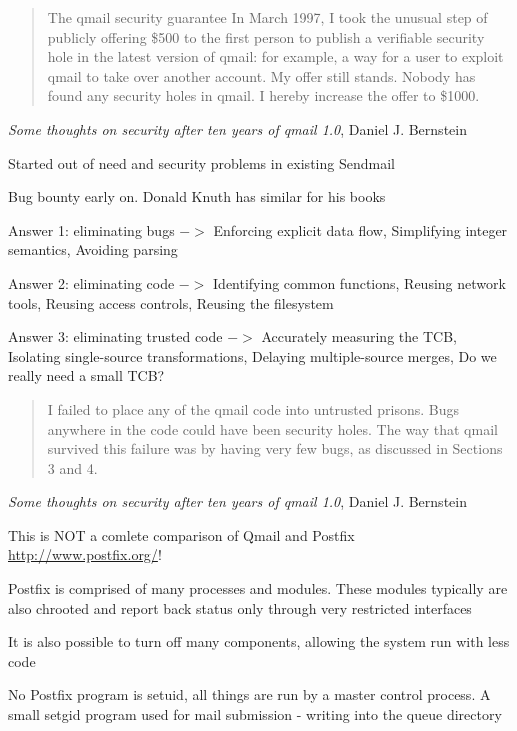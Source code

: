 \documentclass[Screen16to9,17pt]{foils}
\begin{document}

\begin{quote}
The qmail security guarantee
In March 1997, I took the unusual step of publicly offering
\$500 to the first person to publish a verifiable security hole
in the latest version of qmail: for example, a way for a user
to exploit qmail to take over another account. My offer still
stands. Nobody has found any security holes in qmail. I
hereby increase the offer to \$1000.
\end{quote}
\emph{Some thoughts on security after ten years of qmail 1.0},
Daniel J. Bernstein

\begin{list2}
\item Started out of need and security problems in existing Sendmail
\item Bug bounty early on. Donald Knuth has similar for his books
\end{list2}


\begin{list2}
\item Answer 1: eliminating bugs $->$ Enforcing explicit data flow, Simplifying integer semantics, Avoiding parsing
\item Answer 2: eliminating code  $->$ Identifying common functions, Reusing network tools, Reusing access controls, Reusing the filesystem
\item Answer 3: eliminating trusted code $->$ Accurately measuring the TCB, Isolating single-source transformations, Delaying multiple-source merges, Do we really need a small TCB?
\end{list2}


\begin{quote}
I failed to place any of the qmail code into untrusted prisons. Bugs anywhere in the code could have been security holes. The way that qmail survived this failure was by having very few bugs, as discussed in Sections 3 and 4.
\end{quote}
\emph{Some thoughts on security after ten years of qmail 1.0},
Daniel J. Bernstein

\begin{list2}
\item This is NOT a comlete comparison of Qmail and Postfix \url{http://www.postfix.org/}!
\item Postfix is comprised of many processes and modules. These modules typically are also chrooted and report back status only through very restricted interfaces
\item It is also possible to turn off many components, allowing the system run with less code
\item No Postfix program is setuid, all things are run by a master control process. A small setgid program used for mail submission - writing into the queue directory
\end{list2}
\end{document}
